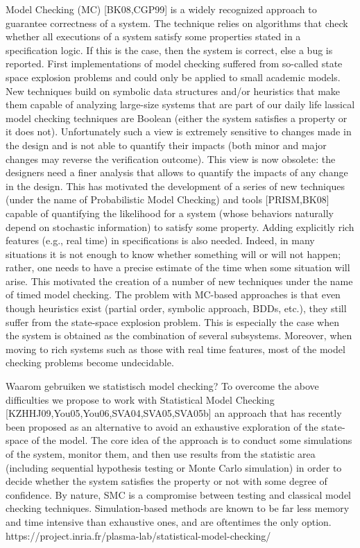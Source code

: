 Model Checking (MC) [BK08,CGP99] is a widely recognized approach to guarantee correctness of a system. The technique relies on algorithms that check whether all executions of a system satisfy some properties stated in a specification logic. If this is the case, then the system is correct, else a bug is reported.
First implementations of model checking suffered from so-called state space explosion problems and could only be applied to small academic models. New techniques build on symbolic data structures and/or heuristics that make them capable of analyzing large-size systems that are part of our daily life
lassical model checking techniques are Boolean (either the system satisfies a property or it does not). Unfortunately such a view is extremely sensitive to changes made in the design and is not able to quantify their impacts (both minor and major changes may reverse the verification outcome).  This view is now obsolete: the designers need a finer analysis that allows to quantify the impacts of any change in the design. This has motivated the development of a series of new techniques (under the name of Probabilistic Model Checking) and tools [PRISM,BK08] capable of quantifying the likelihood for a system (whose behaviors naturally depend on stochastic information) to satisfy some property.  Adding explicitly rich features (e.g., real time) in specifications is also needed. Indeed, in many situations it is not enough to know whether something will or will not happen; rather, one needs to have a precise estimate of the time when some situation will arise. This motivated the creation of a number of new techniques under the name of timed model checking. 
The problem with MC-based approaches is that even though heuristics exist (partial order, symbolic approach, BDDs, etc.), they still suffer from the state-space explosion problem. This is especially the case when the system is obtained as the combination of several subsystems. Moreover, when moving to rich systems such as those with real time features, most of the model checking problems become undecidable.

\cite{inriaStatsMoodCheck}
\cite{ buddeModelChecker}
\cite{AGHASuervey }


Waarom gebruiken we statistisch model checking?
To overcome the above difficulties we propose to work with Statistical Model Checking [KZHHJ09,You05,You06,SVA04,SVA05,SVA05b] an approach that has recently been proposed as an alternative to avoid an exhaustive exploration of the state-space of the model. The core idea of the approach is to conduct some simulations of the system, monitor them, and then use results from the statistic area (including sequential hypothesis testing or Monte Carlo simulation) in order to decide whether the system satisfies the property or not with some degree of confidence. By nature, SMC is a compromise between testing and classical model checking techniques. Simulation-based methods are known to be far less memory and time intensive than exhaustive ones, and are oftentimes the only option. 
https://project.inria.fr/plasma-lab/statistical-model-checking/

